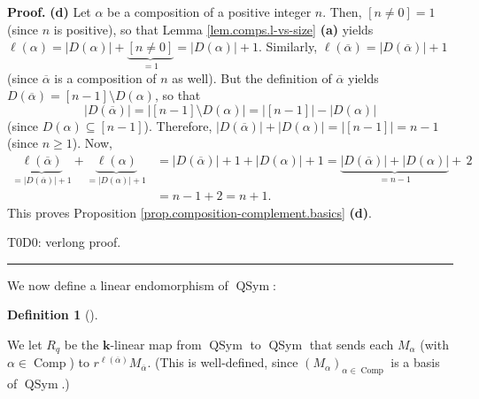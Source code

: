 \documentclass[numbers=enddot,12pt,final,onecolumn,notitlepage]{scrartcl}%
\theoremstyle{definition}
\newtheorem{defi}[theo]{Definition}
\newenvironment{definition}[1][]
{\begin{defi}[#1]\begin{leftbar}}
{\end{leftbar}\end{defi}}
\newenvironment{proof}[1][Proof]{\noindent\textbf{#1.} }{\ \rule{0.5em}{0.5em}}
\newenvironment{verlong}{}{}
\begin{document}
\begin{proof}
\textbf{(d)} Let $\alpha$ be a composition of a positive integer $n$. Then,
$\left[  n\neq0\right]  =1$ (since $n$ is positive), so that Lemma
\ref{lem.comps.l-vs-size} \textbf{(a)} yields $\ell\left(  \alpha\right)
=\left\vert D\left(  \alpha\right)  \right\vert +\underbrace{\left[
n\neq0\right]  }_{=1}=\left\vert D\left(  \alpha\right)  \right\vert +1$.
Similarly, $\ell\left(  \overline{\alpha}\right)  =\left\vert D\left(
\overline{\alpha}\right)  \right\vert +1$ (since $\overline{\alpha}$ is a
composition of $n$ as well). But the definition of $\overline{\alpha}$ yields
$D\left(  \overline{\alpha}\right)  =\left[  n-1\right]  \setminus D\left(
\alpha\right)  $, so that%
\[
\left\vert D\left(  \overline{\alpha}\right)  \right\vert =\left\vert \left[
n-1\right]  \setminus D\left(  \alpha\right)  \right\vert =\left\vert \left[
n-1\right]  \right\vert -\left\vert D\left(  \alpha\right)  \right\vert
\]
(since $D\left(  \alpha\right)  \subseteq\left[  n-1\right]  $). Therefore,
$\left\vert D\left(  \overline{\alpha}\right)  \right\vert +\left\vert
D\left(  \alpha\right)  \right\vert =\left\vert \left[  n-1\right]
\right\vert =n-1$ (since $n\geq1$). Now,%
\begin{align*}
\underbrace{\ell\left(  \overline{\alpha}\right)  }_{=\left\vert D\left(
\overline{\alpha}\right)  \right\vert +1}+\underbrace{\ell\left(
\alpha\right)  }_{=\left\vert D\left(  \alpha\right)  \right\vert +1}  &
=\left\vert D\left(  \overline{\alpha}\right)  \right\vert +1+\left\vert
D\left(  \alpha\right)  \right\vert +1=\underbrace{\left\vert D\left(
\overline{\alpha}\right)  \right\vert +\left\vert D\left(  \alpha\right)
\right\vert }_{=n-1}+\,2\\
&  =n-1+2=n+1.
\end{align*}
This proves Proposition \ref{prop.composition-complement.basics} \textbf{(d)}.
\qedhere


\begin{verlong}
T0D0: verlong proof.
\end{verlong}
\end{proof}

We now define a linear endomorphism of $\operatorname*{QSym}$:

\begin{definition}
\label{def.Rq}We let $R_{q}$ be the $\mathbf{k}$-linear map from
$\operatorname*{QSym}$ to $\operatorname*{QSym}$ that sends each $M_{\alpha}$
(with $\alpha\in\operatorname*{Comp}$) to $r^{\ell\left(  \overline{\alpha
}\right)  }M_{\overline{\alpha}}$. (This is well-defined, since $\left(
M_{\alpha}\right)  _{\alpha\in\operatorname*{Comp}}$ is a basis of
$\operatorname*{QSym}$.)
\end{definition}
\end{document}
